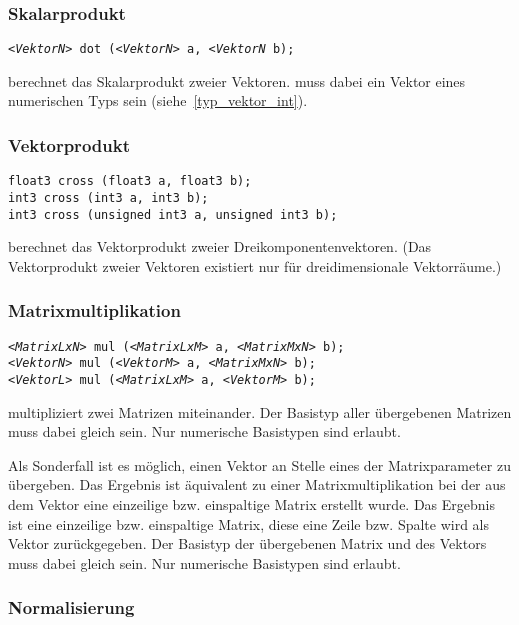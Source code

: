\subsubsection{Skalarprodukt}

\texttt{\emph{<VektorN>} dot (\emph{<VektorN>} a, \emph{<VektorN} b);}

 berechnet das Skalarprodukt zweier Vektoren. 
muss dabei ein Vektor eines numerischen Typs sein (siehe~\ref{typ_vektor_int}).

\subsubsection{Vektorprodukt}
\texttt{float3 cross (float3 a, float3 b);}\\
\texttt{int3 cross (int3 a, int3 b);}\\
\texttt{int3 cross (unsigned int3 a, unsigned int3 b);}

 berechnet das Vektorprodukt zweier Dreikomponentenvektoren.
(Das Vektorprodukt zweier Vektoren existiert nur für dreidimensionale Vektorräume.)

\subsubsection{Matrixmultiplikation}

\texttt{\emph{<MatrixLxN>} mul (\emph{<MatrixLxM>} a, \emph{<MatrixMxN>} b);}\\
\texttt{\emph{<VektorN>} mul (\emph{<VektorM>} a, \emph{<MatrixMxN>} b);}\\
\texttt{\emph{<VektorL>} mul (\emph{<MatrixLxM>} a, \emph{<VektorM>} b);}

 multipliziert zwei Matrizen miteinander. Der Basistyp aller
übergebenen Matrizen muss dabei gleich sein. Nur numerische Basistypen
sind erlaubt.

Als Sonderfall ist es möglich, einen Vektor an Stelle eines der Matrixparameter zu
übergeben. Das Ergebnis ist äquivalent zu einer Matrixmultiplikation bei der
aus dem Vektor eine einzeilige bzw. einspaltige Matrix erstellt wurde. Das
Ergebnis ist eine einzeilige bzw. einspaltige Matrix, diese eine Zeile bzw.
Spalte wird als Vektor zurückgegeben. Der Basistyp der übergebenen Matrix
und des Vektors muss dabei gleich sein. Nur numerische Basistypen sind erlaubt.

\subsubsection{Normalisierung}

